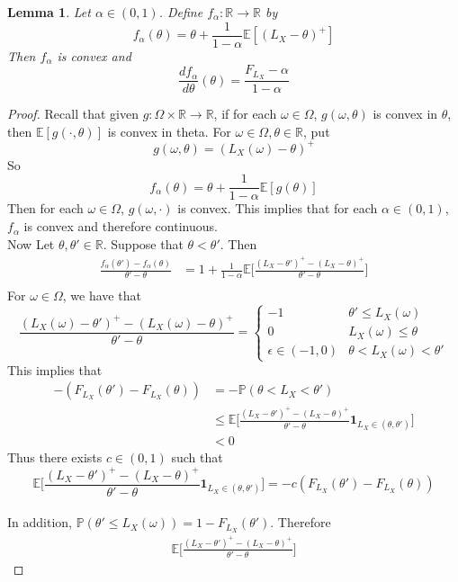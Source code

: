 \documentclass[12pt]{amsart}
\newtheorem{lem}[thm]{Lemma}
\newcommand{\al}{\alpha}
\newcommand{\ep}{\epsilon}
\newcommand{\om}{\omega}
\newcommand{\Om}{\Omega}
\newcommand{\E}{\mathbb{E}}
\newcommand{\R}{\mathbb{R}}
\renewcommand{\P}{\mathbb{P}}
\begin{document}
\begin{lem}
Let $\al \in (0,1)$. Define $f_{\al}: \R \rightarrow \R$ by $$f_\al(\theta) = \theta + \frac{1}{1-\al}\E[(L_X - \theta)^+]$$
Then $f_\al$ is convex and $$\frac{df_\al}{d \theta}(\theta) = \frac{F_{L_X} - \al}{1-\al}$$
\end{lem}

\begin{proof} 
Recall that given $g:\Om \times \R \rightarrow \R$, if for each $\om \in \Om$, $g(\om, \theta)$ is convex in $\theta$, then $\E[g(\cdot, \theta)]$ is convex in theta. For $\om \in \Om, \theta \in \R$, put $$g(\om, \theta) = (L_X(\om) - \theta)^+$$ So $$f_{\al}(\theta) = \theta + \frac{1}{1-\al}\E[g(\theta)]$$ Then for each $\om \in \Om$, $g(\om, \cdot)$ is convex. This implies that for each $\al\in (0,1)$, $f_{\al}$ is convex and therefore continuous. \vspace{3mm}\\ 
Now Let $\theta, \theta' \in \R$. Suppose that $\theta<\theta'$. Then 
\begin{align*}
\frac{f_\al(\theta') - f_\al(\theta)}{\theta' - \theta} 
&= 1 + \frac{1}{1-\al}\E\bigg[\frac{(L_X - \theta')^+ - (L_X - \theta)^+}{\theta'-\theta}\bigg] \\
\end{align*}
For $\om \in \Om$, we have that 
$$\frac{(L_X(\om) - \theta')^+ - (L_X(\om) - \theta)^+}{\theta'-\theta}= 
\begin{cases}
-1 &  \theta' \leq L_X(\om) \\
0 & L_X(\om) \leq  \theta \\
\ep \in (-1,0) &\theta < L_X(\om) < \theta'
\end{cases}$$
This implies that 
\begin{align*}
-(F_{L_X}(\theta') - F_{L_X}(\theta))
&= -\P(\theta < L_X < \theta') \\
&\leq \E\bigg[ \frac{(L_X - \theta')^+ - (L_X - \theta)^+}{\theta'-\theta} \mathbf{1}_{L_X \in (\theta, \theta')}\bigg] \\
&< 0
\end{align*} 
Thus there exists $c \in (0, 1)$ such that $$\E\bigg[ \frac{(L_X - \theta')^+ - (L_X - \theta)^+}{\theta'-\theta} \mathbf{1}_{L_X \in (\theta, \theta')}\bigg] = -c(F_{L_X}(\theta') - F_{L_X}(\theta))$$\vspace{3mm}\\
In addition, $\P(\theta' \leq L_X(\om)) = 1-F_{L_X}(\theta')$.
Therefore 
\begin{align*}
\E\bigg[ \frac{(L_X - \theta')^+ - (L_X - \theta)^+}{\theta'-\theta} \bigg]

\end{align*}
\end{proof}
\end{document}

